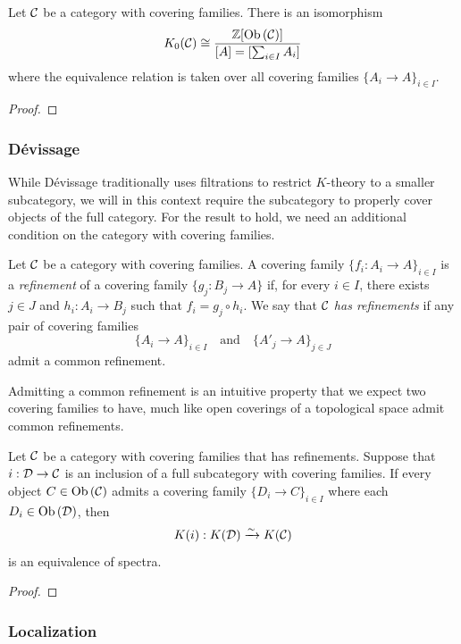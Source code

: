 \begin{proposition}
    Let $\mathcal{C}$ be a category with covering families. There is an isomorphism
    \[ K_0(\mathcal{C}) \cong \frac{\mathbb{Z}[\operatorname{Ob}{\lparen \mathcal{C} \rparen}]}{[A] = [\sum_{i \in I} A_i]} \]
    where the equivalence relation is taken over all covering families $\{A_i \to A\}_{i \in I}$.
\end{proposition}

\begin{proof}
\end{proof}

\subsubsection{Dévissage}
While Dévissage traditionally uses filtrations to restrict $K$-theory to a smaller subcategory, we will in this context require the subcategory to properly cover objects of the full category. For the result to hold, we need an additional condition on the category with covering families.

\begin{definition}
    Let $\mathcal{C}$ be a category with covering families. A covering family $\{ f_i : A_i \to A\}_{i \in I}$ is a \emph{refinement} of a covering family $\{ g_j : B_j \to A\}$ if, for every $i \in I$, there exists $j \in J$ and $h_i : A_i \to B_j$ such that $f_i = g_j \circ h_i$. We say that $\mathcal{C}$ \emph{has refinements} if any pair of covering families
    \[ \{A_i \to A\}_{i \in I} \quad \text{and} \quad \{A'_j \to A\}_{j \in J} \]
    admit a common refinement.
\end{definition}

Admitting  a common refinement is an intuitive property that we expect two covering families to have, much like open coverings of a topological space admit common refinements.

\begin{theorem}\label{theorem:devissage}
    Let $\mathcal{C}$ be a category with covering families that has refinements. Suppose that $i : \mathcal{D} \to \mathcal{C}$ is an inclusion of a full subcategory with covering families. If every object $C \in \operatorname{Ob}{\lparen \mathcal{C} \rparen}$ admits a covering family $\{D_i \to C\}_{i \in I}$ where each $D_i \in \operatorname{Ob}{\lparen \mathcal{D} \rparen}$, then
    \[ K(i) : K(\mathcal{D}) \xrightarrow{\sim} K(\mathcal{C}) \]
    is an equivalence of spectra.
\end{theorem}
\begin{proof}
    
\end{proof}

\subsubsection{Localization}
